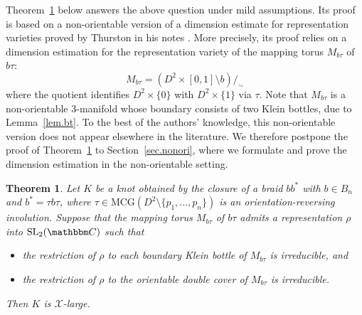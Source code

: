 \documentclass[12pt,reqno]{amsart}
\newtheorem{theorem}{Theorem}[section]
\theoremstyle{definition}
\newtheorem{example}[theorem]{Example}
\def\BC{\mathbbm C}
\def\calX{\mathcal X}
\begin{document}

Theorem~\ref{thm.sym} below answers the above question under mild assumptions. Its proof is based on a non-orientable version of a dimension estimate for representation varieties proved by Thurston in his notes \cite[Theorem~5.6]{ThurstonNotes}. More precisely, its proof relies on a dimension estimation for the representation variety of the mapping torus $M_{b\tau}$ of $b \tau$:
$$M_{b\tau}= (D^2 \times [0,1] \setminus b)/_\sim$$
where the quotient identifies $D^2 \times\{0\}$ with $D^2 \times\{1\}$ via $\tau$.
Note that $M_{b\tau}$ is a non-orientable 3-manifold whose boundary consists of two Klein bottles, due to Lemma~\ref{lem.bt}. To the best of the authors’ knowledge, this non-orientable version does not appear elsewhere in the literature. We therefore postpone the proof of Theorem~\ref{thm.sym} to Section~\ref{sec.nonori}, where we formulate and prove the dimension estimation in the non-orientable setting.

\begin{theorem} \label{thm.sym}
	Let  $K$ be a knot obtained by the closure of a braid $b b^*$ with
	$b\in B_n$ and $b^*=\tau b\tau$, 
	where $\tau\in \mathrm{MCG}(D^2 \setminus \{p_1,\dotsc,p_n\})$
	is an orientation-reversing involution.  
	    Suppose that the mapping torus $M_{b\tau}$ of $b \tau$ admits a representation $\rho$
	into $\mathrm{SL}_2(\BC)$ such that 
	\begin{itemize}
        \item[(a)] the restriction of $\rho$ to each boundary Klein bottle of $M_{b \tau}$ is irreducible, and
        \item[(b)] the restriction of $\rho$ to the orientable double cover of $M_{b \tau}$ 
		is irreducible.
	\end{itemize}
	Then $K$ is $\calX$-large.
\end{theorem}
\end{document}
